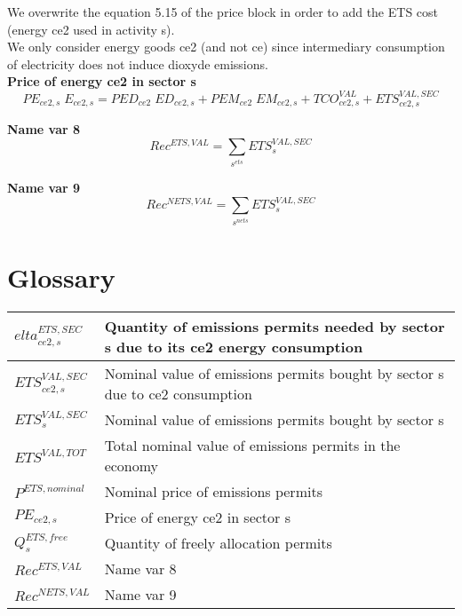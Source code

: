 \documentclass[12pt]{article}
\numberwithin{equation}{section}
\begin{document}
We overwrite the equation 5.15 of the price block in order to add the ETS cost (energy ce2 used in activity s). \\
We only consider energy goods ce2 (and not ce) since intermediary consumption of electricity does not induce dioxyde emissions. \\

\noindent\textbf{Price of energy ce2 in sector s} \\
\begin{dmath}
PE_{ce2, s} \; E_{ce2, s} = PED_{ce2} \; ED_{ce2, s} + PEM_{ce2} \; EM_{ce2, s} + TCO^{VAL}_{ce2, s} + ETS^{VAL,SEC}_{ce2, s}
\end{dmath}



















\noindent\textbf{Name var 8} \\
\begin{dmath}
Rec^{ETS,VAL} = \sum_{s^{ets}} ETS^{VAL,SEC}_{s}
\end{dmath}


\noindent\textbf{Name var 9} \\
\begin{dmath}
Rec^{NETS,VAL} = \sum_{s^{nets}} ETS^{VAL,SEC}_{s}
\end{dmath}









\newpage
        \section{Glossary}
        \normalsize
        \begin{longtable}{@{}p{4cm}p{9cm}@{}} 
$elta^{ETS,SEC}_{ce2, s}$ & Quantity of emissions permits needed by sector s due to its ce2 energy consumption \\
 \midrule 
$ETS^{VAL,SEC}_{ce2, s}$ & Nominal value of emissions permits bought by sector s due to ce2 consumption \\
 \midrule 
$ETS^{VAL,SEC}_{s}$ & Nominal value of emissions permits bought by sector s \\
 \midrule 
$ETS^{VAL,TOT}$ & Total nominal value of emissions permits in the economy \\
 \midrule 
$P^{ETS,nominal}$ & Nominal price of emissions permits \\
 \midrule 
$PE_{ce2, s}$ & Price of energy ce2 in sector s \\
 \midrule 
$Q^{ETS,free}_{s}$ & Quantity of freely allocation permits \\
 \midrule 
$Rec^{ETS,VAL}$ & Name var 8 \\
 \midrule 
$Rec^{NETS,VAL}$ & Name var 9 \\
\end{longtable}
\end{document}
